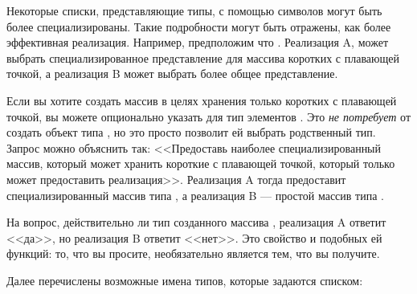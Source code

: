 Некоторые списки, представляющие типы, с помощью символов могут быть более
специализированы. Такие подробности могут быть отражены, как более эффективная
реализация. Например, предположим что . Реализация A,
может выбрать специализированное представление для массива коротких с плавающей
точкой, а реализация B может выбрать более общее представление.

Если вы хотите создать массив в целях хранения только коротких с плавающей
точкой, вы можете опционально указать для  тип элементов
. Это \emph{не потребует} от  создать объект типа
, но это просто позволит ей выбрать родственный тип. Запрос
можно объяснить так: <<Предоставь наиболее специализированный массив, который
может хранить короткие с плавающей точкой, который только может предоставить
реализация>>. Реализация A тогда предоставит специализированный массив типа
, а реализация B --- простой массив типа .

На вопрос, действительно ли тип созданного массива ,
реализация A ответит <<да>>, но реализация B ответит <<нет>>. Это свойство
 и подобных ей функций: то, что вы просите, необязательно
является тем, что вы получите.

Далее перечислены возможные имена типов, которые задаются списком:

